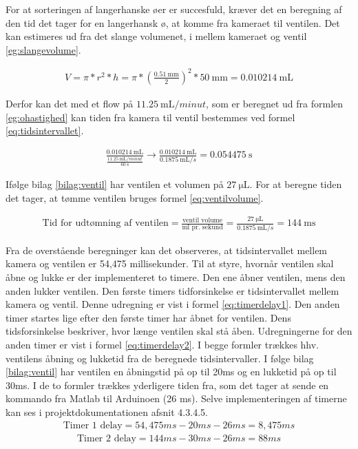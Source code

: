 For at sorteringen af langerhanske øer er succesfuld, kræver det en beregning af den tid det tager for en langerhansk ø, at komme fra kameraet til ventilen. Det kan estimeres ud fra det slange volumenet, i mellem kameraet og ventil \ref{eg:slangevolume}.

\begin{align}
V=\pi*r^2*h=\pi*(\frac{\SI{0,51}{\milli\metre}}{2})^2*\SI{50}{\milli\metre}=\SI{0,010214}{\milli\liter}
\label{eg:slangevolume}
\end{align}

Derfor kan det med et flow på $\SI{11,25}{\milli\liter/minut}$, som er beregnet ud fra formlen \ref{eg:ohastighed} kan tiden fra kamera til ventil bestemmes ved formel \ref{eq:tidsintervallet}. 
 
\begin{align}
\frac{\SI{0,010214}{\milli\liter}}{\frac{\SI{11,25}{\milli\liter/minut}}{\SI{60}{\second}}}\to\frac{\SI{0,010214}{\milli\liter}}{\SI{0,1875}{\milli\liter/s}}=\SI{0.054475}{\second}
\label{eq:tidsintervallet}
\end{align} 

Ifølge bilag \ref{bilag:ventil} har ventilen et volumen på $\SI{27}{\micro\liter}$. For at beregne tiden det tager, at tømme ventilen bruges formel \ref{eq:ventilvolume}. %

\begin{align}
\text{Tid for udtømning af ventilen} = \frac{\text{ventil volume}}{\text{ml pr. sekund}}=\frac{\SI{27}{\micro\liter}}{\SI{0,1875}{\milli\liter/s}}=\SI{144}{\milli\second}
\label{eq:ventilvolume}
\end{align}

Fra de overstående beregninger kan det observeres, at tidsintervallet mellem kamera og ventilen er 54,475 millisekunder. Til at styre, hvornår ventilen skal åbne og lukke er der implementeret to timere. Den ene åbner ventilen, mens den anden lukker ventilen. Den første timers tidforsinkelse er tidsintervallet mellem kamera og ventil. Denne udregning er vist i formel \ref{eq:timerdelay1}. Den anden timer startes lige efter den første timer har åbnet for ventilen. Dens tidsforsinkelse beskriver, hvor længe ventilen skal stå åben. Udregningerne for den anden timer er vist i formel \ref{eq:timerdelay2}. I begge formler trækkes hhv. ventilens åbning og lukketid fra de beregnede tidsintervaller. I følge bilag \ref{bilag:ventil} har ventilen en åbningstid på op til 20ms og en lukketid på op til 30ms. I de to formler trækkes yderligere tiden fra, som det tager at sende en kommando fra Matlab til Arduinoen (26 ms). Selve implementeringen af timerne kan ses i projektdokumentationen afsnit 4.3.4.5. 
\begin{align}
\text{Timer 1 delay}=54,475ms-20ms-26ms=8,475ms
\label{eq:timerdelay1}
\end{align} 
\begin{align}
\text{Timer 2 delay}=144ms-30ms-26ms= 88ms
\label{eq:timerdelay2}
\end{align} 

